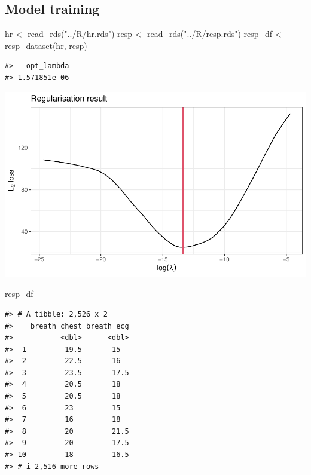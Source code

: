 \documentclass[
]{article}
\newenvironment{Shaded}{\begin{snugshade}}{\end{snugshade}}
\newcommand{\FunctionTok}[1]{\textcolor[rgb]{0.00,0.00,0.00}{#1}}
\newcommand{\NormalTok}[1]{#1}
\newcommand{\OtherTok}[1]{\textcolor[rgb]{0.56,0.35,0.01}{#1}}
\newcommand{\StringTok}[1]{\textcolor[rgb]{0.31,0.60,0.02}{#1}}
\begin{document}
\hypertarget{model-training}{%
\subsection{Model training}\label{model-training}}

\begin{Shaded}
\begin{Highlighting}[]
\NormalTok{hr }\OtherTok{\textless{}{-}} \FunctionTok{read\_rds}\NormalTok{(}\StringTok{"../R/hr.rds"}\NormalTok{)}
\NormalTok{resp }\OtherTok{\textless{}{-}} \FunctionTok{read\_rds}\NormalTok{(}\StringTok{"../R/resp.rds"}\NormalTok{)}
\NormalTok{resp\_df }\OtherTok{\textless{}{-}} \FunctionTok{resp\_dataset}\NormalTok{(hr, resp)}
\end{Highlighting}
\end{Shaded}

\begin{verbatim}
#>   opt_lambda 
#> 1.571851e-06
\end{verbatim}

\begin{center}\includegraphics{report_files/figure-latex/train-1} \end{center}

\begin{Shaded}
\begin{Highlighting}[]
\NormalTok{resp\_df}
\end{Highlighting}
\end{Shaded}

\begin{verbatim}
#> # A tibble: 2,526 x 2
#>    breath_chest breath_ecg
#>           <dbl>      <dbl>
#>  1         19.5       15  
#>  2         22.5       16  
#>  3         23.5       17.5
#>  4         20.5       18  
#>  5         20.5       18  
#>  6         23         15  
#>  7         16         18  
#>  8         20         21.5
#>  9         20         17.5
#> 10         18         16.5
#> # i 2,516 more rows
\end{verbatim}
\end{document}
